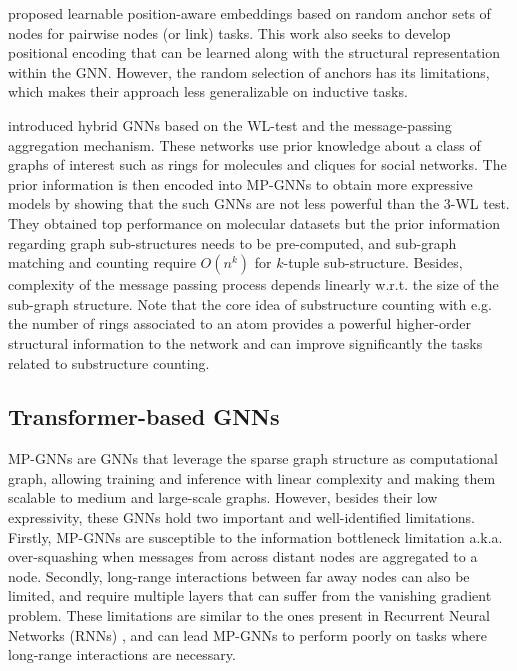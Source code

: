 \documentclass{article} \usepackage{iclr2021_conference,times}
\begin{document}
\cite{you2019position} proposed learnable position-aware embeddings based on random anchor sets of nodes for pairwise nodes (or link) tasks. This work also seeks to develop positional encoding that can be learned along with the structural representation within the GNN. However, the random selection of anchors  has its limitations, which makes their approach less generalizable on inductive tasks.


\cite{bouritsas2020improving,bodnar2021weisfeiler} introduced hybrid GNNs based on the WL-test and the message-passing 
aggregation
mechanism. These networks use prior knowledge about a class of graphs of interest such as rings for molecules and cliques for social networks. The prior information is then encoded into MP-GNNs to obtain more expressive models by showing that the such GNNs are not less powerful than the 3-WL test. They obtained top performance on molecular datasets but the prior information regarding graph sub-structures needs to be pre-computed, and sub-graph matching and counting require $O(n^k)$ for $k$-tuple sub-structure. Besides, complexity of the message passing process depends linearly w.r.t. the size of the sub-graph structure. Note that the core idea of substructure counting with e.g. the number of rings associated to an atom provides a powerful higher-order structural information to the network and can improve significantly the tasks related to substructure counting.




\subsection{Transformer-based GNNs}
\label{sec:related_work_transfGNNs}

MP-GNNs are GNNs that leverage the sparse graph structure as computational graph, allowing training and inference with linear complexity and making them scalable to medium and large-scale graphs. However, besides their low expressivity, these GNNs hold two important and well-identified limitations. Firstly, MP-GNNs are susceptible to the information bottleneck limitation a.k.a. over-squashing \citep{alon2020bottleneck} when messages from across distant nodes are aggregated to a node. Secondly, long-range interactions between far away nodes can also be limited, and require multiple layers that can suffer from the vanishing gradient problem. These limitations are similar to the ones present in Recurrent Neural Networks (RNNs) \citep{hochreiter1997long}, and can lead MP-GNNs to perform poorly on tasks where long-range interactions are necessary. 
\end{document}
